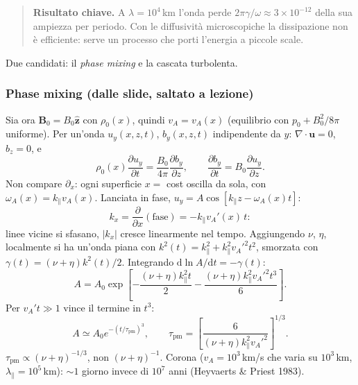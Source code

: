 \begin{quote}
\textbf{Risultato chiave.} A $\lambda=10^4\,$km l'onda perde $2\pi\gamma/\omega\approx3\times10^{-12}$ della sua ampiezza per periodo. Con le diffusività microscopiche la dissipazione non è efficiente: serve un processo che porti l'energia a piccole scale.
\end{quote}
Due candidati: il \emph{phase mixing} e la cascata turbolenta.

\subsubsection{Phase mixing (dalle slide, saltato a lezione)}

Sia ora $\mathbf{B}_0=B_0\hat{\mathbf{z}}$ con $\rho_0(x)$, quindi $v_A=v_A(x)$ (equilibrio con $p_0+B_0^2/8\pi$ uniforme). Per un'onda $u_y(x,z,t)$, $b_y(x,z,t)$ indipendente da $y$: $\nabla\cdot\mathbf{u}=0$, $b_z=0$, e
\begin{equation}
\rho_0(x)\frac{\partial u_y}{\partial t}=\frac{B_0}{4\pi}\frac{\partial b_y}{\partial z},\qquad\frac{\partial b_y}{\partial t}=B_0\frac{\partial u_y}{\partial z}.
\end{equation}
Non compare $\partial_x$: ogni superficie $x=$ cost oscilla da sola, con $\omega_A(x)=k_\parallel v_A(x)$. Lanciata in fase, $u_y=A\cos[k_\parallel z-\omega_A(x)t]$:
\begin{equation}
k_x=\frac{\partial}{\partial x}(\text{fase})=-k_\parallel v_A'(x)\,t:
\end{equation}
linee vicine si sfasano, $|k_x|$ cresce linearmente nel tempo. Aggiungendo $\nu$, $\eta$, localmente si ha un'onda piana con $k^2(t)=k_\parallel^2+k_\parallel^2v_A'^2t^2$, smorzata con $\gamma(t)=(\nu+\eta)k^2(t)/2$. Integrando $\mathrm{d}\ln A/\mathrm{d}t=-\gamma(t)$:
\begin{equation}
A=A_0\exp\left[-\frac{(\nu+\eta)k_\parallel^2t}{2}-\frac{(\nu+\eta)k_\parallel^2v_A'^2t^3}{6}\right].
\end{equation}
Per $v_A't\gg1$ vince il termine in $t^3$:
\begin{equation}
A\simeq A_0e^{-(t/\tau_{\mathrm{pm}})^3},\qquad\tau_{\mathrm{pm}}=\left[\frac{6}{(\nu+\eta)k_\parallel^2v_A'^2}\right]^{1/3}.
\end{equation}
$\tau_{\mathrm{pm}}\propto(\nu+\eta)^{-1/3}$, non $(\nu+\eta)^{-1}$. Corona ($v_A=10^3\,$km/s che varia su $10^3\,$km, $\lambda_\parallel=10^5\,$km): $\sim1$ giorno invece di $10^7$ anni (Heyvaerts \& Priest 1983).

